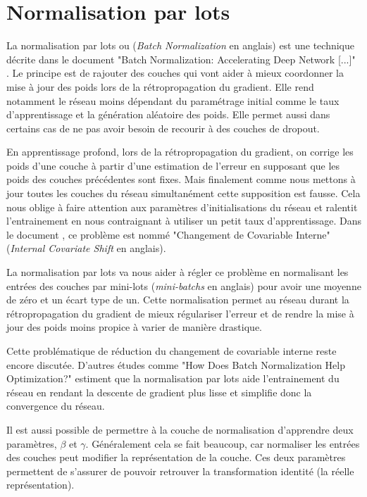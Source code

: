 \section{Normalisation par lots}
\label{sec:5.5}

La normalisation par lots ou (\textit{Batch Normalization} en anglais) est une technique décrite dans le document "Batch Normalization: Accelerating Deep Network [...]" \parencite{ioffe_batch_2015}. Le principe est de rajouter des couches qui vont aider à mieux coordonner la mise à jour des poids lors de la rétropropagation du gradient. Elle rend notamment le réseau moins dépendant du paramétrage initial comme le taux d'apprentissage et la génération aléatoire des poids. Elle permet aussi dans certains cas de ne pas avoir besoin de recourir à des couches de dropout.

En apprentissage profond, lors de la rétropropagation du gradient, on corrige les poids d'une couche à partir d'une estimation de l'erreur en supposant que les poids des couches précédentes sont fixes. Mais finalement comme nous mettons à jour toutes les couches du réseau simultanément cette supposition est fausse. Cela nous oblige à faire attention aux paramètres d'initialisations du réseau et ralentit l'entrainement en nous contraignant à utiliser un petit taux d'apprentissage. Dans le document \parencite{ioffe_batch_2015}, ce problème est nommé "Changement de Covariable Interne" (\textit{Internal Covariate Shift} en anglais).

La normalisation par lots va nous aider à régler ce problème en normalisant les entrées des couches par mini-lots (\textit{mini-batchs} en anglais) pour avoir une moyenne de zéro et un écart type de un. Cette normalisation permet au réseau durant la rétropropagation du gradient de mieux régulariser l'erreur et de rendre la mise à jour des poids moins propice à varier de manière drastique.

Cette problématique de réduction du changement de covariable interne reste encore discutée. D'autres études comme "How Does Batch Normalization Help Optimization?" \parencite{santurkar_how_2019} estiment que la normalisation par lots aide l'entrainement du réseau en rendant la descente de gradient plus lisse et simplifie donc la convergence du réseau.

Il est aussi possible de permettre à la couche de normalisation d'apprendre deux paramètres, $\beta$ et $\gamma$. Généralement cela se fait beaucoup, car normaliser les entrées des couches peut modifier la représentation de la couche. Ces deux paramètres permettent de s'assurer de pouvoir retrouver la transformation identité (la réelle représentation).

